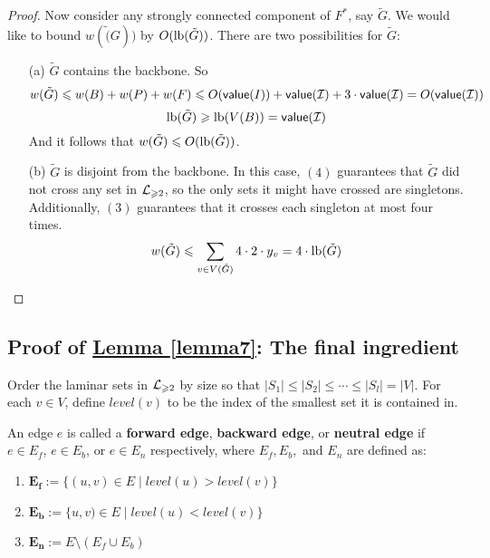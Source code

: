 \documentclass[./main.tex]{subfiles}
\begin{document}
\begin{proof}
			Now consider any strongly connected component of $F^*$, say $\tilde{G}$. We would like to bound $w(\tilde(G))$ by $O(\textup{lb}(\tilde{G}))$. There are two possibilities for $\tilde{G}$:
			\begin{enumerate}
				\item[(a)] $\tilde{G}$ contains the backbone. So $$w(\tilde{G})\leqslant w(B) + w(P) + w(F)\leqslant O(\textsf{\textup{value}}(I)) + \textsf{\textup{value}}(\mathcal{I}) + 3\cdot\textsf{\textup{value}}(\mathcal{I}) = O(\textsf{\textup{value}}(\mathcal{I}))$$
				      $$\textup{lb}(\tilde{G})\geqslant \textup{lb}(V(B)) = \textsf{\textup{value}}(\mathcal{I})$$
				      And it follows that $w(\tilde{G})\leqslant O(\textup{lb}(\tilde{G}))$.
				\item[(b)] $\tilde{G}$ is disjoint from the backbone. In this case, $(4)$ guarantees that $\tilde{G}$ did not cross any set in $\mathcal{L}_{\geqslant 2}$, so the only sets it might have crossed are singletons. Additionally, $(3)$ guarantees that it crosses each singleton at most four times. $$w(\tilde{G})\leqslant \sum_{v\in V(\tilde{G})}4\cdot 2\cdot y_v = 4\cdot\textup{lb}(\tilde{G})$$
			\end{enumerate}
		\end{proof}
		\subsection{Proof of \hyperref[lemma7]{Lemma \ref{lemma7}}: The final ingredient}

			Order the laminar sets in $\mathcal{L}_{\geqslant 2}$ by size so that $|S_1|\leqslant |S_2|\leqslant\cdots\leqslant |S_l| = |V|$. For each $v\in V$, define $level(v)$ to be the index of the smallest set it is contained in.\\
			\begin{definition}
				An edge $e$ is called a \textbf{forward edge}, \textbf{backward edge}, or \textbf{neutral edge} if $e\in E_f$, $e\in E_b$, or $e\in E_n$ respectively, where $E_f, E_b,$ and $E_n$ are defined as:
				\begin{enumerate}[$-$]
					\item $\bm{E_f}:=\{(u,v)\in E\mid level(u) > level(v)\}$
					\item $\bm{E_b}:=\{u,v)\in E\mid level(u) < level(v)\}$
					\item $\bm{E_n}:=E\setminus (E_f\cup E_b)$\\
				\end{enumerate}
			\end{definition}
\end{document}
